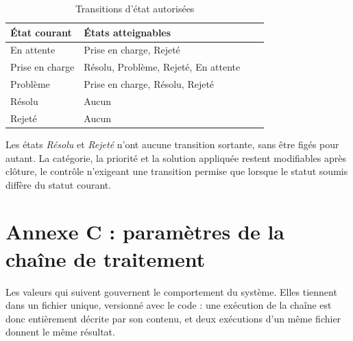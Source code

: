 \begin{table}[!htbp]
\centering
\styletableau
\caption{Transitions d'état autorisées}
\label{tab:transitions}
\begin{tabular}{|Bp{3.6cm}|Lp{9.4cm}|}
\hline
{}
\textbf{État courant} & \textbf{États atteignables} \\
\hline
En attente & Prise en charge, Rejeté \\
\hline
Prise en charge & Résolu, Problème, Rejeté, En attente \\
\hline
Problème & Prise en charge, Résolu, Rejeté \\
\hline
Résolu & Aucun \\
\hline
Rejeté & Aucun \\
\hline
\end{tabular}
\end{table}

Les états \emph{Résolu} et \emph{Rejeté} n'ont aucune transition sortante, sans être figés pour
autant. La catégorie, la priorité et la solution appliquée restent modifiables après clôture, le
contrôle n'exigeant une transition permise que lorsque le statut soumis diffère du statut courant.

\FloatBarrier

\section*{Annexe C : paramètres de la chaîne de traitement}
\renewcommand{\thetable}{C.\arabic{table}}
\setcounter{table}{0}

Les valeurs qui suivent gouvernent le comportement du système. Elles tiennent dans un fichier
unique, versionné avec le code : une exécution de la chaîne est donc entièrement décrite par son
contenu, et deux exécutions d'un même fichier donnent le même résultat.

